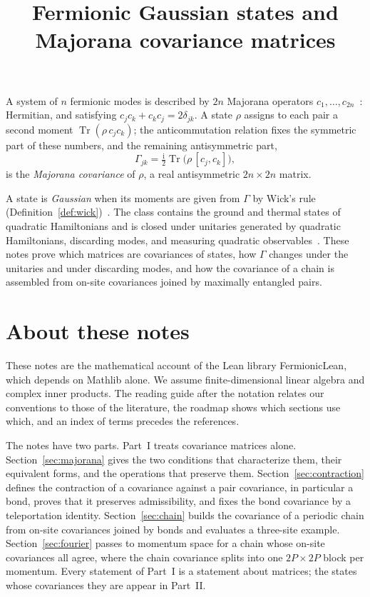 \documentclass[11pt]{article}
\title{Fermionic Gaussian states and Majorana covariance matrices}
\author{}
\date{}
\numberwithin{equation}{section}
\newcommand{\motiv}[1]{#1}
\newcommand{\revs}[1]{#1}
\theoremstyle{definition}
\theoremstyle{remark}
\theoremstyle{plain}
\newcommand{\ii}{\mathrm i}
\begin{document}
\FermionicEnableLinks
\maketitle
\vspace{-2em}
\noindent\motiv{A system of $n$ fermionic modes is described by $2n$ Majorana
operators $c_1,\ldots,c_{2n}$\revs{~\cite{bravyikitaev}}: Hermitian, and satisfying $c_jc_k+c_kc_j=2\delta_{jk}$.
A state $\rho$ assigns to each pair a second moment $\operatorname{Tr}(\rho\,c_jc_k)$;
the anticommutation relation fixes the symmetric part of these numbers, and the
remaining antisymmetric part,
\[
 \Gamma_{jk}=\tfrac{\ii}{2}\operatorname{Tr}\bigl(\rho\,[c_j,c_k]\bigr),
\]
is the \emph{Majorana covariance} of $\rho$, a real antisymmetric $2n\times2n$ matrix.

A state is \emph{Gaussian} when its moments are given from $\Gamma$ by Wick's rule
(Definition~\ref{def:wick})~\cite[Sec.~2]{bravyi}. The class contains the ground and thermal states of
quadratic Hamiltonians and is closed under unitaries generated by quadratic
Hamiltonians, discarding modes, and measuring quadratic observables~\cite{terhal}.
These notes prove which matrices are covariances of states, how $\Gamma$ changes
\revs{under the unitaries and under discarding modes}, and how the covariance of a chain is assembled from on-site
covariances joined by maximally entangled pairs.}

\setcounter{tocdepth}{2}
{\small\tableofcontents}

\section*{About these notes}
\noindent\motiv{\revs{These notes are the mathematical account of the Lean library FermionicLean,
which depends on Mathlib alone. We assume finite-dimensional linear algebra and complex inner
products. The reading guide after the notation relates our conventions to those of the literature,
the roadmap shows which sections use which, and an index of terms precedes the references.}}

\medskip
\noindent\motiv{\revs{The notes have} two parts. Part~I treats covariance matrices alone. Section~\ref{sec:majorana}
gives the two conditions that characterize them, their equivalent forms, and the operations
that preserve them. Section~\ref{sec:contraction} defines the contraction of a covariance
against \revs{a pair covariance, in particular a bond}, proves that it preserves admissibility, and fixes the bond covariance by a
teleportation identity. Section~\ref{sec:chain} builds the covariance of a periodic chain
from on-site covariances joined by bonds and evaluates a three-site example.
Section~\ref{sec:fourier} passes to momentum space for a chain whose on-site covariances all
agree, where the chain covariance splits into one $2P\times2P$ block per momentum. Every
statement of Part~I is a statement about matrices; the states whose covariances they are
appear in Part~II.}
\end{document}
